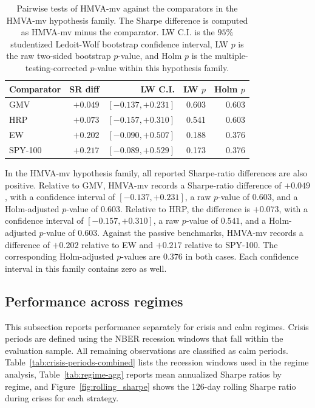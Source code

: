 \documentclass[12pt]{article}
\begin{document}
\begin{table}[!ht]
\centering
\caption{Pairwise tests of HMVA-mv against the comparators in the HMVA-mv hypothesis family. The Sharpe difference is computed as HMVA-mv minus the comparator. LW C.I. is the $95\%$ studentized Ledoit-Wolf bootstrap confidence interval, LW $p$ is the raw two-sided bootstrap $p$-value, and Holm $p$ is the multiple-testing-corrected $p$-value within this hypothesis family.}
\label{tab:res-tests-hmva-mv}
\begin{tabular}{lrrrr}
\toprule
Comparator & SR diff & LW C.I. & LW $p$ & Holm $p$\\
\midrule
GMV  & $+0.049$ & $[-0.137, +0.231]$ & 0.603 & 0.603\\
HRP  & $+0.073$ & $[-0.157, +0.310]$ & 0.541 & 0.603\\
EW   & $+0.202$ & $[-0.090, +0.507]$ & 0.188 & 0.376\\
SPY-100 & $+0.217$ & $[-0.089, +0.529]$ & 0.173 & 0.376\\
\bottomrule
\end{tabular}
\end{table}

In the HMVA-mv hypothesis family, all reported Sharpe-ratio differences are also positive. Relative to GMV, HMVA-mv records a Sharpe-ratio difference of $+0.049$, with a confidence interval of $[-0.137,+0.231]$, a raw $p$-value of $0.603$, and a Holm-adjusted $p$-value of $0.603$. Relative to HRP, the difference is $+0.073$, with a confidence interval of $[-0.157,+0.310]$, a raw $p$-value of $0.541$, and a Holm-adjusted $p$-value of $0.603$. Against the passive benchmarks, HMVA-mv records a difference of $+0.202$ relative to EW and $+0.217$ relative to SPY-100. The corresponding Holm-adjusted $p$-values are $0.376$ in both cases. Each confidence interval in this family contains zero as well.


\subsection{Performance across regimes}
\label{sec:res-regime}

This subsection reports performance separately for crisis and calm regimes. Crisis periods are defined using the NBER recession windows that fall within the evaluation sample. All remaining observations are classified as calm periods. Table~\ref{tab:crisis-periods-combined} lists the recession windows used in the regime analysis, Table~\ref{tab:regime-agg} reports mean annualized Sharpe ratios by regime, and Figure~\ref{fig:rolling_sharpe} shows the 126-day rolling Sharpe ratio during crises for each strategy.
\end{document}
